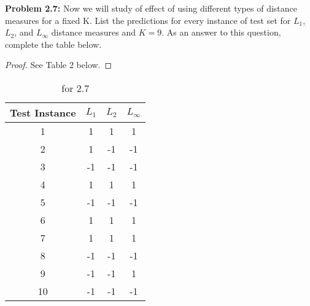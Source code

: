 \documentclass[11pt]{amsart}
\newenvironment{problem}[1]
{\par \noindent \ignorespaces \textbf{Problem #1:}}
{}
\begin{document}
\begin{problem} {2.7} Now we will study of effect of using different types of distance measures for a fixed K. List the predictions for every instance of test set for $L_1$,  $L_2$, and $L_ \infty$ distance measures and $K = 9$. As an answer to this question, complete the table below.
\end{problem}
\begin{proof}See Table 2 below.
\end{proof} 
\begin{table}[h]
\caption{for 2.7}
\begin{tabular}{cccc}
\hline
\multicolumn{1}{|c|}{Test Instance} & \multicolumn{1}{c|}{$L_1$} & \multicolumn{1}{c|}{$L_2$} & \multicolumn{1}{c|}{$L_\infty$} \\ \hline
1                                   & 1                       & 1                       & 1                         \\
2                                   & 1                       & -1                      & -1                        \\
3                                   & -1                      & -1                      & -1                        \\
4                                   & 1                       & 1                       & 1                         \\
5                                   & -1                      & -1                      & -1                        \\
6                                   & 1                       & 1                       & 1                         \\
7                                   & 1                       & 1                       & 1                         \\
8                                   & -1                      & -1                      & -1                        \\
9                                   & -1                      & -1                      & 1                         \\
10                                  & -1                      & -1                      & -1                       
\end{tabular}
\end{table}
\end{document}
